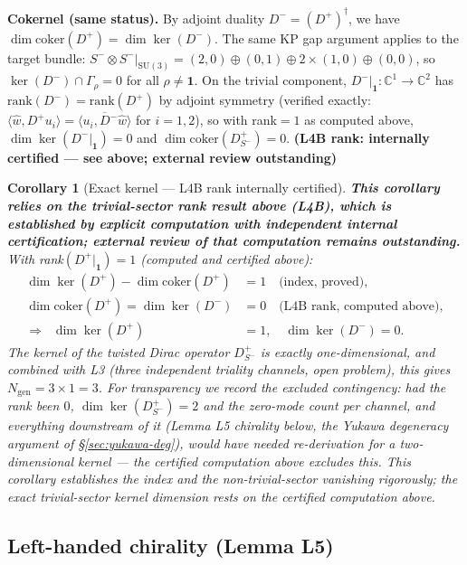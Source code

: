 \documentclass[12pt,a4paper]{article}
\newtheorem{corollary}[lemma]{Corollary}
\begin{document}
\textbf{Cokernel (same status).}
By adjoint duality $D^- = (D^+)^\dagger$, we have
$\dim\mathrm{coker}(D^+) = \dim\ker(D^-)$.
The same KP gap argument applies to the target bundle:
$S^-\otimes S^-|_{\mathrm{SU}(3)} = (2,0)\oplus(0,1)\oplus 2\times(1,0)\oplus(0,0)$,
so $\ker(D^-)\cap\Gamma_\rho = 0$ for all $\rho\neq\mathbf{1}$.
On the trivial component, $D^-|_{\mathbf{1}}: \mathbb{C}^1\to\mathbb{C}^2$ has
$\mathrm{rank}(D^-) = \mathrm{rank}(D^+)$ by adjoint symmetry (verified exactly:
$\langle\hat w, D^+u_i\rangle = \overline{\langle u_i, D^-\hat w\rangle}$ for $i=1,2$),
so with rank$=1$ as computed above, $\dim\ker(D^-|_{\mathbf{1}}) = 0$
and $\dim\mathrm{coker}(D^+_{S^-}) = 0$. \quad\textbf{(L4B rank: internally certified
--- see above; external review outstanding)}

\begin{corollary}[Exact kernel --- L4B rank internally certified]
\textbf{This corollary relies on the trivial-sector rank result above (L4B), which is
established by explicit computation with independent internal certification; external
review of that computation remains outstanding.} With rank$(D^+|_{\mathbf 1})=1$
(computed and certified above):
\begin{align}
  \dim\ker(D^+) - \dim\mathrm{coker}(D^+) &= 1 \quad\text{(index, proved)},\\
  \dim\mathrm{coker}(D^+) = \dim\ker(D^-) &= 0 \quad\text{(L4B rank, computed above)},\\
  \Rightarrow\;\; \dim\ker(D^+) &= 1,\quad \dim\ker(D^-)=0.
\end{align}
The kernel of the twisted Dirac operator
$D^+_{S^-}$ is exactly one-dimensional, and combined with L3 (three independent triality
channels, open problem), this gives $N_{\mathrm{gen}}=3\times 1=3$. For transparency we
record the excluded contingency: had the rank been $0$, $\dim\ker(D^+_{S^-})=2$ and the
zero-mode count per channel, and everything downstream of it (Lemma L5 chirality below,
the Yukawa degeneracy argument of \S\ref{sec:yukawa-deg}), would have needed re-derivation
for a two-dimensional kernel --- the certified computation above excludes this.
This corollary establishes the index and the non-trivial-sector
vanishing rigorously; the exact trivial-sector kernel dimension rests on the certified
computation above.
\end{corollary}

\subsection{Left-handed chirality (Lemma L5)}
\label{sec:chirality}
\end{document}
